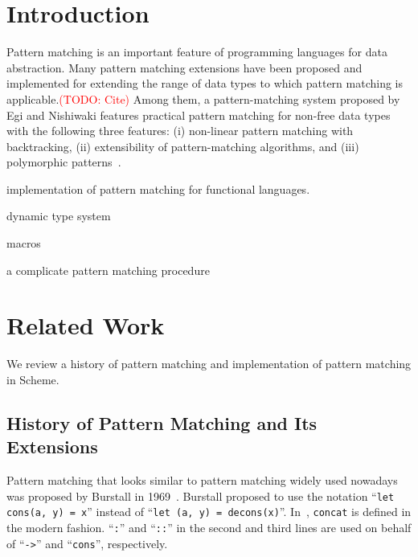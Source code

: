 \documentclass[acmlarge]{acmart}
\newcommand{\todo}[1]{\textcolor{red}{(TODO: #1)}}
\begin{document}

\maketitle

\section{Introduction}\label{intro}

Pattern matching is an important feature of programming languages for data abstraction.
Many pattern matching extensions have been proposed and implemented for extending the range of data types to which pattern matching is applicable.\todo{Cite}
Among them, a pattern-matching system proposed by Egi and Nishiwaki features practical pattern matching for non-free data types with the following three features: (i) non-linear pattern matching with backtracking, (ii) extensibility of pattern-matching algorithms, and (iii) polymorphic patterns~\cite{egi2018aplas}.

implementation of pattern matching for functional languages.

dynamic type system

macros

a complicate pattern matching procedure

\cite{egisonScheme}

\section{Related Work}\label{history}

We review a history of pattern matching and implementation of pattern matching in Scheme.

\subsection{History of Pattern Matching and Its Extensions}\label{history1}

Pattern matching that looks similar to pattern matching widely used nowadays was proposed by Burstall in 1969~\cite{burstall1969proving}.
Burstall proposed to use the notation ``\texttt{let cons(a, y) = x}'' instead of ``\texttt{let (a, y) = decons(x)}''.
In~\cite{burstall1969proving}, \texttt{concat} is defined in the modern fashion.
``\texttt{:}'' and ``\texttt{::}'' in the second and third lines are used on behalf of ``\texttt{->}'' and ``\texttt{cons}'', respectively.
\end{document}
